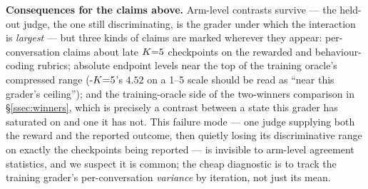 \textbf{Consequences for the claims above.} Arm-level contrasts survive --- the held-out judge,
the one still discriminating, is the grader under which the interaction is \emph{largest} --- but
three kinds of claims are marked wherever they appear: per-conversation claims about late $K{=}5$
checkpoints on the rewarded and behaviour-coding rubrics; absolute endpoint levels near the top
of the training oracle's compressed range (\GRPO-$K{=}5$'s $4.52$ on a 1--5 scale should be read as
``near this grader's ceiling''); and the training-oracle side of the two-winners comparison in
\S\ref{ssec:winners}, which is precisely a contrast between a state this grader has saturated on
and one it has not. This failure mode --- one judge supplying both the reward and the reported
outcome, then quietly losing its discriminative range on exactly the checkpoints being reported
--- is invisible to arm-level agreement statistics, and we suspect it is common; the cheap
diagnostic is to track the training grader's per-conversation \emph{variance} by iteration, not
just its mean.
